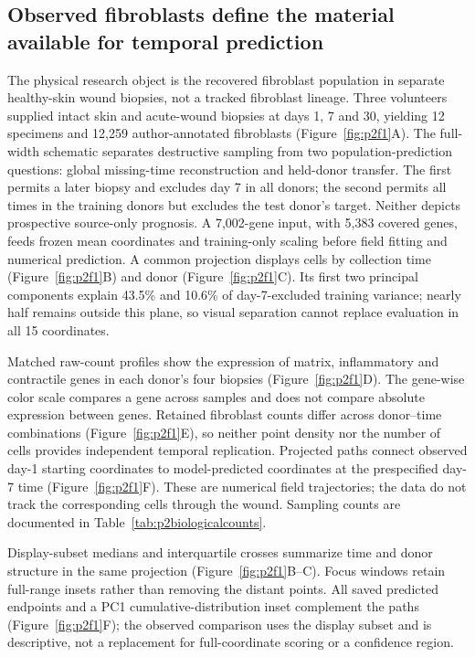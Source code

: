 \subsection{Observed fibroblasts define the material available for temporal prediction}

The physical research object is the recovered fibroblast population in separate healthy-skin wound biopsies, not a tracked fibroblast lineage. Three volunteers supplied intact skin and acute-wound biopsies at days 1, 7 and 30, yielding 12 specimens and 12,259 author-annotated fibroblasts (Figure~\ref{fig:p2f1}A\label{call:p2f1}). The full-width schematic separates destructive sampling from two population-prediction questions: global missing-time reconstruction and held-donor transfer. The first permits a later biopsy and excludes day 7 in all donors; the second permits all times in the training donors but excludes the test donor's target. Neither depicts prospective source-only prognosis. A 7,002-gene input, with 5,383 covered genes, feeds frozen mean coordinates and training-only scaling before field fitting and numerical prediction. A common projection displays cells by collection time (Figure~\ref{fig:p2f1}B) and donor (Figure~\ref{fig:p2f1}C). Its first two principal components explain 43.5\% and 10.6\% of day-7-excluded training variance; nearly half remains outside this plane, so visual separation cannot replace evaluation in all 15 coordinates.


Matched raw-count profiles show the expression of matrix, inflammatory and contractile genes in each donor's four biopsies (Figure~\ref{fig:p2f1}D). The gene-wise color scale compares a gene across samples and does not compare absolute expression between genes. Retained fibroblast counts differ across donor--time combinations (Figure~\ref{fig:p2f1}E), so neither point density nor the number of cells provides independent temporal replication. Projected paths connect observed day-1 starting coordinates to model-predicted coordinates at the prespecified day-7 time (Figure~\ref{fig:p2f1}F). These are numerical field trajectories; the data do not track the corresponding cells through the wound. Sampling counts are documented in Table~\ref{tab:p2biologicalcounts}.

Display-subset medians and interquartile crosses summarize time and donor structure in the same projection (Figure~\ref{fig:p2f1}B--C). Focus windows retain full-range insets rather than removing the distant points. All saved predicted endpoints and a PC1 cumulative-distribution inset complement the paths (Figure~\ref{fig:p2f1}F); the observed comparison uses the display subset and is descriptive, not a replacement for full-coordinate scoring or a confidence region.

